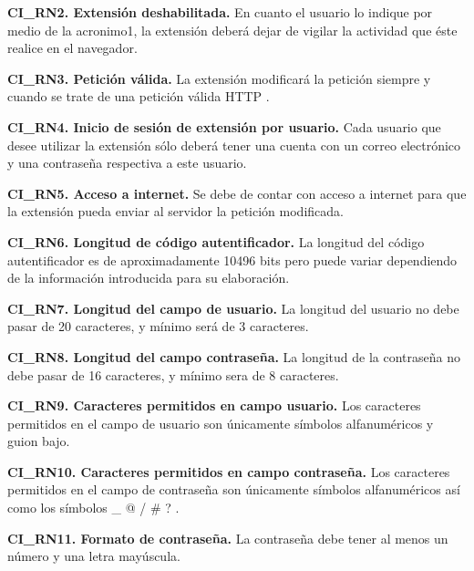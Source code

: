 \documentclass[12pt, a4paper, titlepage]{report}
\begin{document}
			\textbf{CI\_RN2. Extensión deshabilitada.} En cuanto el usuario lo indique por medio de la \acrlong{acronimo1}, la extensión deberá dejar de vigilar la actividad que éste realice en el navegador.\\
			\label{CI_RN2}
			
            \textbf{CI\_RN3. Petición válida.} La extensión modificará la petición siempre y cuando se trate de una petición válida HTTP .\\
            \label{CI_RN3}
            
            \textbf{CI\_RN4. Inicio de sesión de extensión por usuario.} Cada usuario que desee utilizar la extensión sólo deberá tener una cuenta con un correo electrónico y una contraseña respectiva a este usuario. \\
            \label{CI_RN4}
            
            \textbf{CI\_RN5. Acceso a internet.} Se debe de contar con acceso a internet para que la extensión pueda enviar al servidor la petición modificada.\\
            \label{CI_RN5}
				
			\textbf{CI\_RN6. Longitud de código autentificador.} La longitud del código autentificador es de aproximadamente 10496 bits pero puede variar dependiendo de la información introducida para su elaboración.\\
			\label{CI_RN6}
			
			\textbf{CI\_RN7. Longitud del campo de usuario.} La longitud del usuario no debe pasar de 20 caracteres, y mínimo será de 3 caracteres.\\
			\label{CI_RN7}
			
			\textbf{CI\_RN8. Longitud del campo contraseña.}
			La longitud de la contraseña no debe pasar de 16 caracteres, y mínimo sera de 8 caracteres.\\
			\label{CI_RN8}
			
			\textbf{CI\_RN9. Caracteres permitidos en campo usuario.} Los caracteres permitidos en el campo de usuario son únicamente símbolos alfanuméricos y guion bajo.\\
			\label{CI_RN9}
			
			\textbf{CI\_RN10. Caracteres permitidos en campo contraseña.} Los caracteres permitidos en el campo de contraseña son únicamente símbolos alfanuméricos así como los s\'imbolos \_ @ / \# ? .\\
			\label{CI_RN10}
			
			\textbf{CI\_RN11. Formato de contraseña.} La contraseña debe tener al menos un número y una letra mayúscula.\\
			\label{CI_RN11}
			
\end{document}
